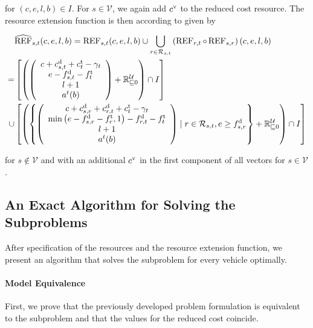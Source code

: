 for $(c,e,l,b)\in I$. For $s\in\mathcal{V}$, we again add $c^{\operatorname{v}}$ to the reduced cost resource. The resource extension function is then according to  given by

\begin{align*}
	& \widehat{\operatorname{REF}}_{s,t}(c,e,l,b) = \operatorname{REF}_{s,t}(c,e,l,b)\cup\bigcup_{r\in\mathcal{R}_{s,t}}\left(\operatorname{REF}_{r,t}\circ\operatorname{REF}_{s,r}\right)(c,e,l,b) \\
	= & \left[\left(\left(\begin{array}{c}
		c + c^{\operatorname{d}}_{s,t} + c^{\operatorname{t}}_t - \gamma_t \\ e - f^{\operatorname{d}}_{s,t} - f^{\operatorname{t}}_t \\ l + 1 \\ a^t(b)
	\end{array} \right) + \mathbb{R}^{\mathcal{U}}_{\sqsubseteq 0}\right)\cap I\right] \\
	\cup & \left[\left(\left\{\left(\begin{array}{c}
		c + c^{\operatorname{d}}_{s,r} + c^{\operatorname{d}}_{r,t} + c^{\operatorname{t}}_t - \gamma_t \\ \min\left(e-f^{\operatorname{d}}_{s,r}-f^{\operatorname{t}}_r,1\right) - f^{\operatorname{d}}_{r,t} - f^{\operatorname{t}}_t \\ l + 1 \\ a^t(b)
	\end{array}\right) \mid r\in\mathcal{R}_{s,t}, e\geq f^{\operatorname{d}}_{s,r}\right\} + \mathbb{R}^{\mathcal{U}}_{\sqsubseteq 0}\right)\cap I\right]
\end{align*}

for $s\notin\mathcal{V}$ and with an additional $c^{\operatorname{v}}$ in the first component of all vectors for $s\in\mathcal{V}$.


\subsection{An Exact Algorithm for Solving the Subproblems}

After specification of the resources and the resource extension function, we present an algorithm that solves the subproblem for every vehicle optimally.

\paragraph{Model Equivalence} \parfill

First, we prove that the previously developed problem formulation is equivalent to the subproblem and that the values for the reduced cost coincide.

